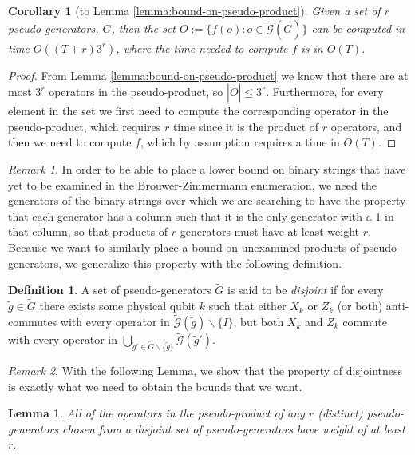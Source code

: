 \documentclass[12pt]{amsbook}
\theoremstyle{plain}
\newtheorem{lemma}{Lemma}
\newtheorem{corollary}{Corollary}
\theoremstyle{definition}
\newtheorem{definition}{Definition}
\theoremstyle{remark}
\newtheorem{remark}{Remark}
\newcommand{\set}{\tilde}
\newcommand{\genfun}{\tilde{\mathcal{G}}}
\begin{document}
\begin{corollary}[to Lemma \ref{lemma:bound-on-pseudo-product}]
\label{corolary:bound-on-pseudo-product}
Given a set of $r$ pseudo-generators, $\set G$, then the set $\set O:=\{f(o):o\in\genfun(\set G)\}$ can be computed in time $O((T+r) 3^r)$, where the time needed to compute $f$ is in $O(T)$.
\end{corollary}

\begin{proof}
From Lemma \ref{lemma:bound-on-pseudo-product} we know that there are at most $3^r$ operators in the pseudo-product, so $|\set O|\le 3^r$.  Furthermore, for every element in the set we first need to compute the corresponding operator in the pseudo-product, which requires $r$ time since it is the product of $r$ operators, and then we need to compute $f$, which by assumption requires a time in $O(T)$.
\end{proof}
\begin{remark}
In order to be able to place a lower bound on binary strings that have yet to be examined in the Brouwer-Zimmermann enumeration, we need the generators of the binary strings over which we are searching to have the property that each generator has a column such that it is the only generator with a 1 in that column, so that products of $r$ generators must have at least weight $r$.  Because we want to similarly place a bound on unexamined products of pseudo-generators, we generalize this property with the following definition.
\end{remark}

\begin{definition}
\label{definition:disjoint-pseudo-generators}
A set of pseudo-generators $\set G$ is said to be \emph{disjoint} if for every $\set g\in\set G$ there exists some physical qubit $k$ such that either $X_k$ or $Z_k$ (or both) anti-commutes with every operator in $\genfun(\set g)\backslash\{I\}$, but both $X_k$ and $Z_k$ commute with every operator in $\bigcup_{\set g'\in\set G\backslash\{\set g\}}\genfun(\set g')$.
\end{definition}

\begin{remark}
With the following Lemma, we show that the property of disjointness is exactly what we need to obtain the bounds that we want.
\end{remark}

\begin{lemma}
\label{lemma:disjoint-pseudo-generators-bound}
All of the operators in the pseudo-product of any $r$ (distinct) pseudo-generators chosen from a disjoint set of pseudo-generators have weight of at least $r$.
\end{lemma}
\end{document}
